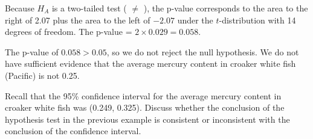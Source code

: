 \begin{examplewrap}
\begin{nexample}
\begin{description}
\begin{center}
\end{center}
Because $H_A$ is a two-tailed test ( $\ne$ ), the p-value corresponds to the area to the right of 2.07 plus the area to the left of $-2.07$ under the $t$-distribution with 14 degrees of freedom.  The p-value = $2\times 0.029 = 0.058$.  

\item[\inferencestep{Conclude}]  The p-value of $0.058 > 0.05$, so we do not reject the null hypothesis. We do not have sufficient evidence that the average mercury content in croaker white fish (Pacific) is not 0.25.
\end{description}
\end{nexample}
\end{examplewrap}




\begin{exercisewrap}
\begin{nexercise}Recall that the 95\% confidence interval for the average mercury content in croaker white fish was (0.249, 0.325). Discuss whether the conclusion of the hypothesis test in the previous example is consistent or inconsistent with the conclusion of the confidence interval.\footnotemark
\end{nexercise}
\end{exercisewrap}


\D{\newpage}



